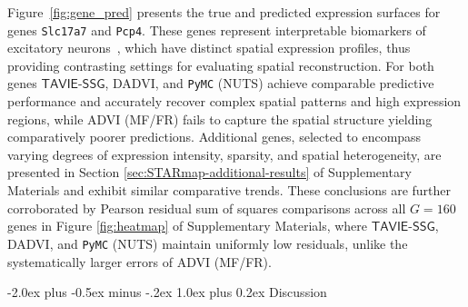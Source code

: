 \documentclass[12pt]{article}
\makeatletter
\def\section{\@startsection{section}{1}{\z@}
  {-2.0ex plus -0.5ex minus -.2ex} %
  {1.0ex plus 0.2ex}               %
  {\normalfont\Large\bfseries}}
\numberwithin{equation}{section}
\newcommand{\tssg}{\mathsf{TAVIE}\text{-}\mathsf{SSG}}
\makeatother
\begin{document}
Figure~\ref{fig:gene_pred} presents the true and predicted expression surfaces for genes \texttt{Slc17a7} and \texttt{Pcp4}. These genes represent interpretable biomarkers of excitatory neurons~\citep{STARmap}, which have distinct spatial expression profiles, thus providing contrasting settings for evaluating spatial reconstruction. For both genes $\tssg$, DADVI, and \texttt{PyMC} (NUTS) achieve comparable predictive performance and accurately recover complex spatial patterns and high expression regions, while ADVI (MF/FR) fails to capture the spatial structure yielding comparatively poorer predictions. Additional genes, selected to encompass varying degrees of expression intensity, sparsity, and spatial heterogeneity, are presented in Section \ref{sec:STARmap-additional-results} of Supplementary Materials and exhibit similar comparative trends. These conclusions are further corroborated by Pearson residual sum of squares comparisons across all $G=160$ genes in Figure \ref{fig:heatmap} of Supplementary Materials, where $\tssg$, DADVI, and \texttt{PyMC} (NUTS) maintain uniformly low residuals, unlike the systematically larger errors of ADVI (MF/FR).


\section{Discussion}\label{section:discussion}
\end{document}
